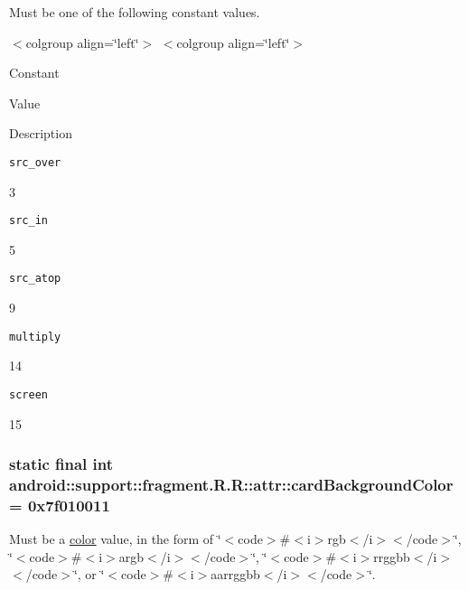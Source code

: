 Must be one of the following constant values. \begin{TabularC}{0}
\hline
\end{TabularC}
$<$colgroup align=\char`\"{}left\char`\"{}$>$ $<$colgroup align=\char`\"{}left\char`\"{}$>$ 

Constant

Value

Description 

{\tt src\_\-over}

3

{\tt src\_\-in}

5

{\tt src\_\-atop}

9

{\tt multiply}

14

{\tt screen}

15\hypertarget{classandroid_1_1support_1_1fragment_1_1_r_1_1attr_b6f3b42f218a092defb217961b0ae7d2}{
\subsubsection[{cardBackgroundColor}]{\setlength{\rightskip}{0pt plus 5cm}static final int android::support::fragment.R.R::attr::cardBackgroundColor = 0x7f010011}}
\label{classandroid_1_1support_1_1fragment_1_1_r_1_1attr_b6f3b42f218a092defb217961b0ae7d2}


Must be a \hyperlink{classandroid_1_1support_1_1fragment_1_1_r_1_1color}{color} value, in the form of \char`\"{}$<$code$>$\#$<$i$>$rgb$<$/i$>$$<$/code$>$\char`\"{}, \char`\"{}$<$code$>$\#$<$i$>$argb$<$/i$>$$<$/code$>$\char`\"{}, \char`\"{}$<$code$>$\#$<$i$>$rrggbb$<$/i$>$$<$/code$>$\char`\"{}, or \char`\"{}$<$code$>$\#$<$i$>$aarrggbb$<$/i$>$$<$/code$>$\char`\"{}. 

